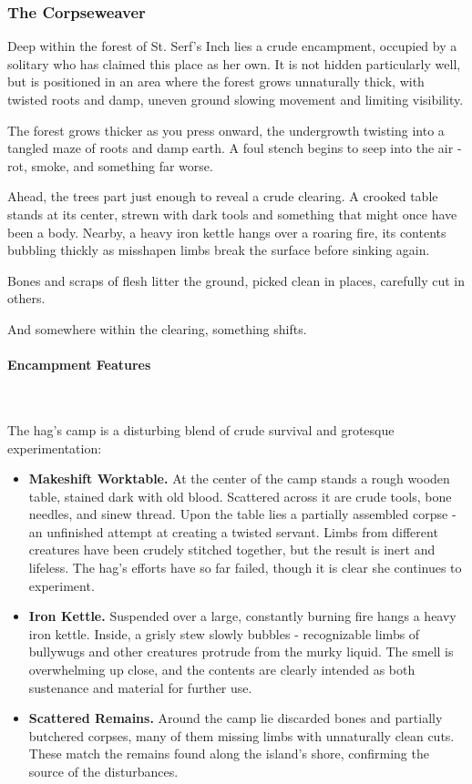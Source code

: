 \subsubsection*{The Corpseweaver}
{\entryfont Deep within the forest of St. Serf's Inch lies a crude encampment, occupied by a solitary \hyperref[monster:CentipedeHag]{} who has claimed this place as her own. It is not hidden particularly well, but is positioned in an area where the forest grows unnaturally thick, with twisted roots and damp, uneven ground slowing movement and limiting visibility.}
\begin{DndReadAloud}
	The forest grows thicker as you press onward, the undergrowth twisting into a tangled maze of roots and damp earth. A foul stench begins to seep into the air - rot, smoke, and something far worse.

	Ahead, the trees part just enough to reveal a crude clearing. A crooked table stands at its center, strewn with dark tools and something that might once have been a body. Nearby, a heavy iron kettle hangs over a roaring fire, its contents bubbling thickly as misshapen limbs break the surface before sinking again.

	Bones and scraps of flesh litter the ground, picked clean in places, carefully cut in others.

	And somewhere within the clearing, something shifts.
\end{DndReadAloud}
\paragraph*{Encampment Features}\hfill\\
{\entryfont The hag's camp is a disturbing blend of crude survival and grotesque experimentation:
\begin{itemize}\renewcommand\labelitemi{\textbf{\textbullet}}
	\item \textbf{Makeshift Worktable.} At the center of the camp stands a rough wooden table, stained dark with old blood. Scattered across it are crude tools, bone needles, and sinew thread. Upon the table lies a partially assembled corpse - an unfinished attempt at creating a twisted servant. Limbs from different creatures have been crudely stitched together, but the result is inert and lifeless. The hag's efforts have so far failed, though it is clear she continues to experiment.
	\item \textbf{Iron Kettle.} Suspended over a large, constantly burning fire hangs a heavy iron kettle. Inside, a grisly stew slowly bubbles - recognizable limbs of bullywugs and other creatures protrude from the murky liquid. The smell is overwhelming up close, and the contents are clearly intended as both sustenance and material for further use.
	\item \textbf{Scattered Remains.} Around the camp lie discarded bones and partially butchered corpses, many of them missing limbs with unnaturally clean cuts. These match the remains found along the island's shore, confirming the source of the disturbances.
\end{itemize}}
